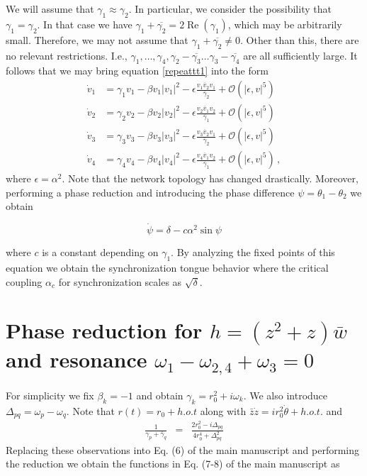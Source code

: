 \documentclass[12pt]{article}
\renewcommand{\mathcal}{\mathscr}
\theoremstyle{plain}
\theoremstyle{definition}
\theoremstyle{remark}
\theoremstyle{remark}
\DeclareMathOperator{\re}{Re}
\begin{document}
We will assume that $\gamma_1 \approx \gamma_2$. In particular, we consider the possibility that $\gamma_1 = \gamma_2$. In that case we have $\gamma_1 + \overline{\gamma_2} = 2\re(\gamma_1)$, which may be arbitrarily small. Therefore, we may not assume that $\gamma_1 + \overline{\gamma_2} \not= 0$. Other than this, there are no relevant restrictions. I.e., $\gamma_1, \dots, \gamma_4, \gamma_2 - \overline{\gamma_3} \dots \gamma_3 - \overline{\gamma_4}$ are all sufficiently large.
It follows that we may bring equation \eqref{repeattt1} into the form
\begin{align}\label{repeattt2}
\dot{v}_1 &= \gamma_1v_1 - \beta v_1|v_1|^2 - \epsilon\frac{v_1\overline{v}_2v_1}{\overline{\gamma}_2}  + \mathcal{O}(|\epsilon, v|^5)\\ \nonumber
\dot{v}_2 &= \gamma_2v_2 - \beta v_2|v_2|^2 - \epsilon\frac{v_2\overline{v}_1v_2}{\overline{\gamma}_1}  + \mathcal{O}(|\epsilon, v|^5)\\ \nonumber
\dot{v}_3 &= \gamma_3v_3 - \beta v_3|v_3|^2 - \epsilon\frac{v_3\overline{v}_2v_1}{\overline{\gamma}_2}  + \mathcal{O}(|\epsilon, v|^5)\\ \nonumber
\dot{v}_4 &= \gamma_4v_4 - \beta v_4|v_4|^2 - \epsilon\frac{v_4\overline{v}_1v_2}{\overline{\gamma}_1}  + \mathcal{O}(|\epsilon, v|^5)\, ,
\end{align}
where $\epsilon = \alpha^2$. Note that the network topology has changed drastically. Moreover, performing a phase reduction and introducing the phase difference $\psi = \theta_1 - \theta_2$
we obtain

$$
\dot \psi = \delta - c \alpha^2 \sin \psi
$$

where $c$ is a constant depending on $\gamma_1$. By analyzing the fixed points of this equation we obtain the synchronization tongue behavior where the critical coupling $\alpha_c$ for synchronization scales as $\sqrt{\delta}$.

\newpage

\section{Phase reduction for $h = (z^2 +  z) \bar w$ and resonance $\omega_1 - \omega_{2,4} + \omega_3 = 0$}\label{Sec:NumRecovery}

For simplicity we fix $\beta_k = -1$ and obtain
$
\gamma_k = r_0^2 + i \omega_k. 
$ We also introduce $\Delta_{pq} = \omega_p - \omega_q$.  
Note that $r(t) = r_0 + h.o.t$ along with
$
\bar z \dot z = i r_0^2 \dot \theta +h.o.t.
$
and
\begin{eqnarray}
\frac{1}{\gamma_p + \bar \gamma_q} &=& \frac{2r_0^2 - i \Delta_{pq}}{4 r_0^4 + \Delta_{pq}^2}
\end{eqnarray}
Replacing these observations into Eq. (6) of the main manuscript and performing the reduction we obtain the functions in Eq. (7-8) of the main manuscript as
\end{document}
